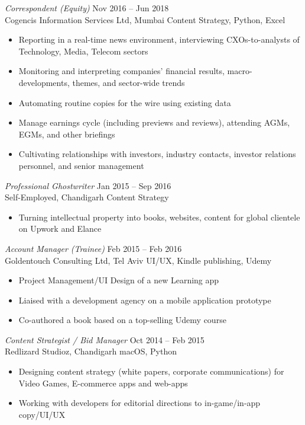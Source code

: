 \documentclass[margin, 10pt]{res} %
\begin{document}
\begin{resume}
{\sl Correspondent (Equity)} \hfill Nov 2016 – Jun 2018 \\
Cogencis Information Services Ltd, Mumbai \hfill Content Strategy, Python, Excel
\begin{itemize}
\item Reporting in a real-time news environment, interviewing CXOs-to-analysts of Technology, Media, Telecom sectors
\item Monitoring and interpreting companies’ financial results, macro-developments, themes, and sector-wide trends
\item Automating routine copies for the wire using existing data
\item Manage earnings cycle (including previews and reviews), attending AGMs, EGMs, and other briefings
\item Cultivating relationships with investors, industry contacts, investor relations personnel, and senior management

\end{itemize}

{\sl Professional Ghostwriter} \hfill Jan 2015 – Sep 2016 \\
Self-Employed, Chandigarh \hfill Content Strategy
\begin{itemize}
\item Turning intellectual property into books, websites, content for global clientele on Upwork and Elance
\end{itemize}

{\sl Account Manager (Trainee)} \hfill Feb 2015 – Feb 2016 \\
Goldentouch Consulting Ltd, Tel Aviv \hfill UI/UX, Kindle publishing, Udemy 
\begin{itemize}
\item Project Management/UI Design of a new Learning app
\item Liaised with a development agency on a mobile application prototype
\item Co-authored a book based on a top-selling Udemy course
\end{itemize}

{\sl Content Strategist / Bid Manager} \hfill Oct 2014 – Feb 2015 \\
Redlizard Studioz, Chandigarh \hfill macOS, Python 
\begin{itemize}
\item Designing content strategy (white papers, corporate communications) for Video Games, E-commerce apps and web-apps
\item Working with developers for editorial directions to in-game/in-app copy/UI/UX
\end{itemize}


\end{resume}
\end{document}
